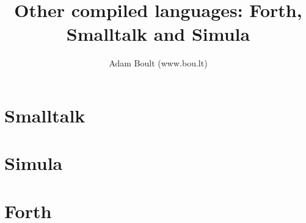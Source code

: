 \documentclass[oneside]{book}
\begin{document}
\author{Adam Boult (www.bou.lt)}
\title{Other compiled languages: Forth, Smalltalk and Simula}
\maketitle

\setcounter{tocdepth}{0}
\tableofcontents



\part{Smalltalk}

\part{Simula}

\part{Forth}

\end{document}
